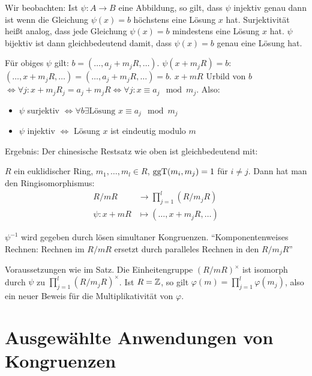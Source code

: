 \documentclass[a4paper,twoside,DIV15,BCOR12mm]{scrbook}
\begin{document}
Wir beobachten: Ist $\psi: A\to B$ eine Abbildung, so gilt, dass
$\psi$ injektiv genau dann ist wenn die Gleichung $\psi(x) = b$
höchstens eine Lösung $x$ hat. Surjektivität heißt analog, dass jede
Gleichung $\psi(x) = b$ mindestens eine Lösung $x$ hat. $\psi$
bijektiv ist dann gleichbedeutend damit, dass $\psi(x) =b $ genau
eine Lösung hat.

Für obiges $\psi$ gilt: $b = (\ldots,a_j+ m_jR,\ldots)$.
$\psi(x+m_jR)=b$: $(\ldots,x+m_jR,\ldots) =(\ldots,a_j+m_jR,\ldots)
= b$. $x+mR$ Urbild von $b$ $\iff \forall j: x+m_jR_j = a_j+m_jR
\iff \forall j: x \equiv a_j \mod m_j$. Also:
\begin{itemize}
\item $\psi$ surjektiv $\iff \forall b \exists \text{Lösung } x\equiv a_j \mod m_j$
\item $\psi$ injektiv $\iff$ Lösung $x$ ist eindeutig modulo $m$
\end{itemize}
Ergebnis: Der chinesische Restsatz wie oben ist gleichbedeutend mit:

\begin{satz}
$R$ ein euklidischer Ring, $m_1,\ldots,m_l\in R$, $\mathop{\rm ggT}\nolimits(m_i,m_j)=1$
für $i\ne j$. Dann hat man den Ringisomorphismus:
\begin{align*}
R/mR &\to \prod_{j=1}^l (R/m_jR) \\
\psi: x + mR &\mapsto (\ldots, x + m_jR, \ldots )
\end{align*}
\end{satz}

\begin{bemerkung}
$\psi^{-1}$ wird gegeben durch lösen simultaner Kongruenzen.
"`Komponentenweises Rechnen: Rechnen im $R/mR$ ersetzt durch
paralleles Rechnen in den $R/m_jR$"'
\end{bemerkung}

\begin{bemerkung}
Voraussetzungen wie im Satz. Die Einheitengruppe $(R/mR)^\times$ ist
isomorph durch $\psi$ zu $\prod_{j=1}^l (R/m_jR)^\times $. Ist
$R=\mathbb{Z}$, so gilt $\varphi(m) = \prod_{j=1}^l \varphi(m_j)$, also
ein neuer Beweis für die Multiplikativität von $\varphi$.
\end{bemerkung}

\section{Ausgewählte Anwendungen von Kongruenzen}
\end{document}
